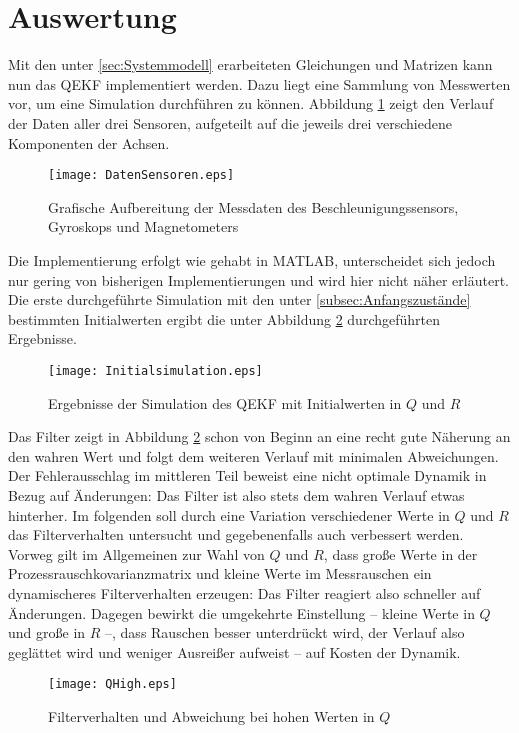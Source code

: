 \documentclass[12pt,a4paper]{article}
\begin{document}
		\section{Auswertung}
		Mit den unter \ref{sec:Systemmodell} erarbeiteten Gleichungen und Matrizen kann nun das QEKF implementiert werden. Dazu liegt eine Sammlung von Messwerten vor, um eine Simulation durchführen zu können. Abbildung \ref{fig:DatenSensoren} zeigt den Verlauf der Daten aller drei Sensoren, aufgeteilt auf die jeweils drei verschiedene Komponenten der Achsen.
		\begin{figure}[!ht]
			\hspace{-2cm}
			\texttt{[image: DatenSensoren.eps]}
			\caption{\label{fig:DatenSensoren}\centering Grafische Aufbereitung der Messdaten des Beschleunigungssensors, Gyroskops und Magnetometers}
		\end{figure}
		Die Implementierung erfolgt wie gehabt in MATLAB, unterscheidet sich jedoch nur gering von bisherigen Implementierungen und wird hier nicht näher erläutert.\\
		
		Die erste durchgeführte Simulation mit den unter \ref{subsec:Anfangszustände} bestimmten Initialwerten ergibt die unter Abbildung \ref{fig:Initialsimulation} durchgeführten Ergebnisse.
		\begin{figure}[!ht]
			\hspace{-2cm}
			\texttt{[image: Initialsimulation.eps]}
			\caption{\label{fig:Initialsimulation}\centering Ergebnisse der Simulation des QEKF mit Initialwerten in $Q$ und $R$}
		\end{figure}
		Das Filter zeigt in Abbildung \ref{fig:Initialsimulation} schon von Beginn an eine recht gute Näherung an den wahren Wert und folgt dem weiteren Verlauf mit minimalen Abweichungen. Der Fehlerausschlag im mittleren Teil beweist eine nicht optimale Dynamik in Bezug auf Änderungen: Das Filter ist also stets dem wahren Verlauf etwas hinterher. Im folgenden soll durch eine Variation verschiedener Werte in $Q$ und $R$ das Filterverhalten untersucht und gegebenenfalls auch verbessert werden.\\
		
		Vorweg gilt im Allgemeinen zur Wahl von $Q$ und $R$, dass große Werte in der Prozessrauschkovarianzmatrix und kleine Werte im Messrauschen ein dynamischeres Filterverhalten erzeugen: Das Filter reagiert also schneller auf Änderungen. Dagegen bewirkt die umgekehrte Einstellung -- kleine Werte in $Q$ und große in $R$ --, dass Rauschen besser unterdrückt wird, der Verlauf also geglättet wird und weniger Ausreißer aufweist -- auf Kosten der Dynamik.\\
		\begin{figure}[!ht]
			\hspace{-2cm}
			\texttt{[image: QHigh.eps]}
			\caption{\label{fig:QHigh}\centering Filterverhalten und Abweichung bei hohen Werten in $Q$}
		\end{figure}
	
\end{document}
